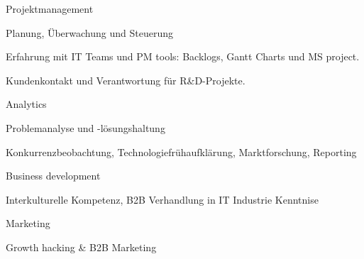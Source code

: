 


\begin{cventries}
	
	\zcventry
	{Projektmanagement} %
	{
		\begin{cvitems} %
			\item {Planung, Überwachung und Steuerung }
			\item {Erfahrung mit IT Teams und PM tools: Backlogs, Gantt Charts und MS project.}
			\item {Kundenkontakt und Verantwortung für R\&D-Projekte.}
		\end{cvitems}
	}
	
	\zcventry
	{Analytics} %
	{
		\begin{cvitems} %
			\item {Problemanalyse und -lösungshaltung}
			\item {Konkurrenzbeobachtung, Technologiefrühaufklärung, Marktforschung, Reporting}
		\end{cvitems}
	}
	
	\zcventry
	{Business development} %
	{
		\begin{cvitems} %
			\item {Interkulturelle Kompetenz, B2B Verhandlung in IT Industrie Kenntnise}
		\end{cvitems}
	}
	
	\zcventry
	{Marketing} %
	{
		\begin{cvitems} %
			\item {Growth hacking \& B2B Marketing}
		\end{cvitems}
	}
	
\end{cventries}
